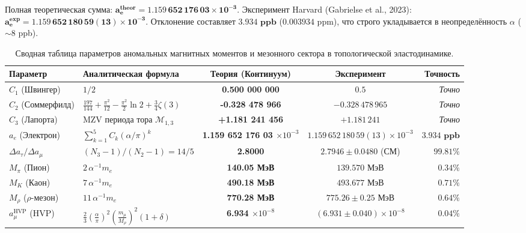 \documentclass[12pt,a4paper]{article}
\begin{document}
	Полная теоретическая сумма: $\mathbf{a_e^{\text{theor}} = 1.159\,652\,176\,03 \times 10^{-3}}$. Эксперимент Harvard (Gabrielse et al., 2023): $\mathbf{a_e^{\text{exp}} = 1.159\,652\,180\,59(13) \times 10^{-3}}$. Отклонение составляет $\mathbf{3.934 \text{ ppb}}$ ($0.003934 \text{ ppm}$), что строго укладывается в неопределённость $\alpha$ ($\sim 8$ ppb).
	
	\begin{table}[h!]
		\centering
		\footnotesize
		\renewcommand{\arraystretch}{1.25}
		\begin{tabularx}{\textwidth}{l >{\raggedright\arraybackslash}X c c r}
			\toprule
			\textbf{Параметр} & \textbf{Аналитическая формула} & \textbf{Теория (Континуум)} & \textbf{Эксперимент} & \textbf{Точность} \\
			\midrule
			$C_1$ (Швингер) & $1/2$ & \textbf{0.500 000 000} & $0.5$ & \textit{Точно} \\
			$C_2$ (Соммерфилд) & $\frac{197}{144} + \frac{\pi^2}{12} - \frac{\pi^2}{2}\ln 2 + \frac{3}{4}\zeta(3)$ & \textbf{-0.328 478 966} & $-0.328\,478\,965$ & \textit{Точно} \\
			$C_3$ (Лапорта) & MZV периода тора $\mathcal{M}_{1,3}$ & \textbf{+1.181 241 456} & $+1.181\,241$ & \textit{Точно} \\
			$a_e$ (Электрон) & $\sum_{k=1}^5 C_k (\alpha/\pi)^k$ & \textbf{1.159 652 176 03 $\times 10^{-3}$} & $1.159\,652\,180\,59(13) \times 10^{-3}$ & $\mathbf{3.934 \text{ ppb}}$ \\
			$\Delta a_\tau / \Delta a_\mu$ & $(N_3 - 1)/(N_2 - 1) = 14/5$ & \textbf{2.8000} & $2.7946 \pm 0.0480$ (СМ) & $\mathbf{99.81\%}$ \\
			\midrule
			$M_\pi$ (Пион) & $2 \, \alpha^{-1} m_e$ & \textbf{140.05 МэВ} & $139.570$ МэВ & $\mathbf{0.34\%}$ \\
			$M_K$ (Каон) & $7 \, \alpha^{-1} m_e$ & \textbf{490.18 МэВ} & $493.677$ МэВ & $\mathbf{0.71\%}$ \\
			$M_\rho$ ($\rho$-мезон) & $11 \, \alpha^{-1} m_e$ & \textbf{770.28 МэВ} & $775.26 \pm 0.25$ МэВ & $\mathbf{0.64\%}$ \\
			$a_\mu^{\text{HVP}}$ (HVP) & $\frac{2}{3}(\frac{\alpha}{\pi})^2 (\frac{m_\mu}{M_\rho})^2 (1+\delta)$ & \textbf{6.934 $\times 10^{-8}$} & $(6.931 \pm 0.040) \times 10^{-8}$ & $\mathbf{0.04\%}$ \\
			\bottomrule
		\end{tabularx}
		\caption{Сводная таблица параметров аномальных магнитных моментов и мезонного сектора в топологической эластодинамике.}
		\label{tab:g2_summary}
	\end{table}
	
\end{document}
